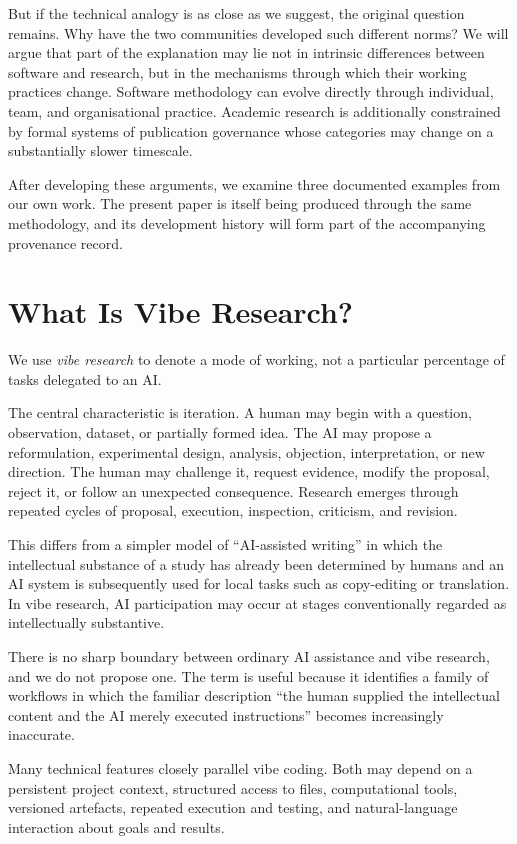 \documentclass[12pt]{article}
\begin{document}
But if the technical analogy is as close as we suggest, the original question remains. Why have the two communities developed such different norms? We will argue that part of the explanation may lie not in intrinsic differences between software and research, but in the mechanisms through which their working practices change. Software methodology can evolve directly through individual, team, and organisational practice. Academic research is additionally constrained by formal systems of publication governance whose categories may change on a substantially slower timescale.

After developing these arguments, we examine three documented examples from our own work. The present paper is itself being produced through the same methodology, and its development history will form part of the accompanying provenance record.


\section{What Is Vibe Research?}

We use \emph{vibe research} to denote a mode of working, not a particular percentage of tasks delegated to an AI.

The central characteristic is iteration. A human may begin with a question, observation, dataset, or partially formed idea. The AI may propose a reformulation, experimental design, analysis, objection, interpretation, or new direction. The human may challenge it, request evidence, modify the proposal, reject it, or follow an unexpected consequence. Research emerges through repeated cycles of proposal, execution, inspection, criticism, and revision.

This differs from a simpler model of ``AI-assisted writing'' in which the intellectual substance of a study has already been determined by humans and an AI system is subsequently used for local tasks such as copy-editing or translation. In vibe research, AI participation may occur at stages conventionally regarded as intellectually substantive.

There is no sharp boundary between ordinary AI assistance and vibe research, and we do not propose one. The term is useful because it identifies a family of workflows in which the familiar description ``the human supplied the intellectual content and the AI merely executed instructions'' becomes increasingly inaccurate.

Many technical features closely parallel vibe coding. Both may depend on a persistent project context, structured access to files, computational tools, versioned artefacts, repeated execution and testing, and natural-language interaction about goals and results.
\end{document}
